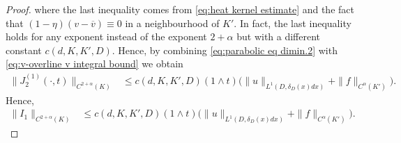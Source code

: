 \documentclass[12pt,a4paper,onecolumn]{amsart}
\theoremstyle{definition}
\newcommand{\1}{\mathbf 1}
\newcommand{\LLL}{L^1(D,\de(x)dx)}
\newcommand{\de}{\delta_D}
\numberwithin{equation}{section}
\begin{document}
\begin{proof}
    where the last inequality comes from \eqref{eq:heat kernel estimate} and the fact that $(1-\eta)(v-\overline v)\equiv 0$ in a neighbourhood of $K'$. In fact, the last inequality holds for any exponent instead of the exponent $2+\alpha$ but with a different constant $c(d,K,K',D)$. Hence, by combining \eqref{eq:parabolic eq dimin.2} with \eqref{eq:v-overline v integral bound} we obtain
    \begin{align*}
        \|J^{(1)}_2(\cdot,t)\|_{C^{2+\alpha}(K)}&\le c(d,K,K',D)(1\wedge t)\big(\|u\|_{\LLL}+\|f\|_{C^\alpha({K'})}\big).
    \end{align*}
    Hence,
    \begin{align}\label{eq:I1 smooth}
        \|I_1\|_{C^{2+\alpha}(K)}&\le c(d,K,K',D)(1\wedge t)(\|u\|_{\LLL}+\|f\|_{C^\alpha({K'})}\big).
    \end{align}
 

\end{proof}
\end{document}
